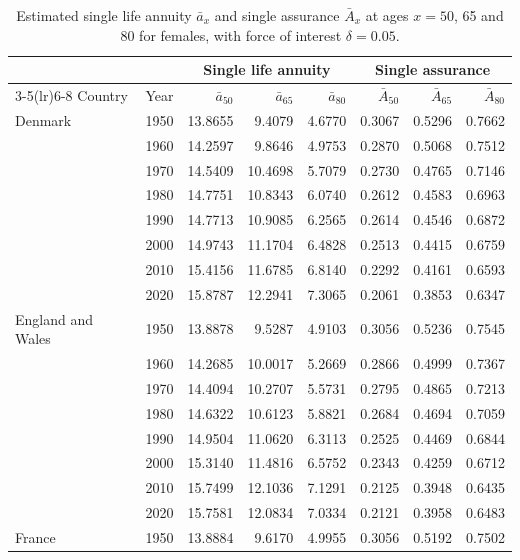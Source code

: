 \begin{table}[h]
\centering
\footnotesize
\renewcommand{\arraystretch}{0.92}
\caption{Estimated single life annuity $\bar{a}_x$ and single assurance $\bar{A}_x$ at ages $x=50$, 65 and 80 for females, with force of interest $\delta=0.05$.}
\label{tab:actuarial}
\begin{tabular*}{\textwidth}{@{\extracolsep{\fill}}llrrrrrr}
\toprule
& & \multicolumn{3}{c}{Single life annuity} & \multicolumn{3}{c}{Single assurance}\\
\cmidrule(lr){3-5}\cmidrule(lr){6-8}
Country & Year & $\bar{a}_{50}$ & $\bar{a}_{65}$ & $\bar{a}_{80}$ & $\bar{A}_{50}$ & $\bar{A}_{65}$ & $\bar{A}_{80}$\\
\midrule
Denmark & 1950 & 13.8655 & 9.4079 & 4.6770 & 0.3067 & 0.5296 & 0.7662\\
 & 1960 & 14.2597 & 9.8646 & 4.9753 & 0.2870 & 0.5068 & 0.7512\\
 & 1970 & 14.5409 & 10.4698 & 5.7079 & 0.2730 & 0.4765 & 0.7146\\
 & 1980 & 14.7751 & 10.8343 & 6.0740 & 0.2612 & 0.4583 & 0.6963\\
 & 1990 & 14.7713 & 10.9085 & 6.2565 & 0.2614 & 0.4546 & 0.6872\\
 & 2000 & 14.9743 & 11.1704 & 6.4828 & 0.2513 & 0.4415 & 0.6759\\
 & 2010 & 15.4156 & 11.6785 & 6.8140 & 0.2292 & 0.4161 & 0.6593\\
 & 2020 & 15.8787 & 12.2941 & 7.3065 & 0.2061 & 0.3853 & 0.6347\\
\addlinespace[2pt]
England and Wales & 1950 & 13.8878 & 9.5287 & 4.9103 & 0.3056 & 0.5236 & 0.7545\\
 & 1960 & 14.2685 & 10.0017 & 5.2669 & 0.2866 & 0.4999 & 0.7367\\
 & 1970 & 14.4094 & 10.2707 & 5.5731 & 0.2795 & 0.4865 & 0.7213\\
 & 1980 & 14.6322 & 10.6123 & 5.8821 & 0.2684 & 0.4694 & 0.7059\\
 & 1990 & 14.9504 & 11.0620 & 6.3113 & 0.2525 & 0.4469 & 0.6844\\
 & 2000 & 15.3140 & 11.4816 & 6.5752 & 0.2343 & 0.4259 & 0.6712\\
 & 2010 & 15.7499 & 12.1036 & 7.1291 & 0.2125 & 0.3948 & 0.6435\\
 & 2020 & 15.7581 & 12.0834 & 7.0334 & 0.2121 & 0.3958 & 0.6483\\
\addlinespace[2pt]
France & 1950 & 13.8884 & 9.6170 & 4.9955 & 0.3056 & 0.5192 & 0.7502\\

\end{tabular*}
\end{table}
